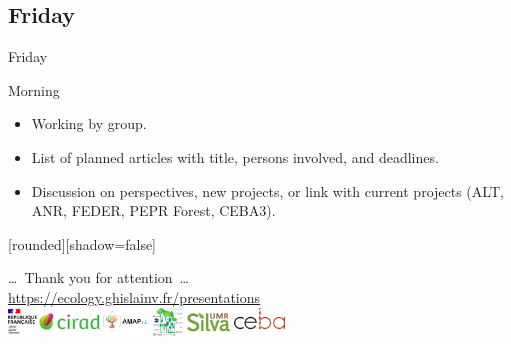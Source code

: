 \documentclass[10pt,table,dvipsnames,compress]{beamer}
\begin{document}
\subsection{Friday}
\label{sec:org99b291f}

\begin{frame}[label={sec:org8e439e6}]{Friday}
\begin{block}{Morning}
\begin{itemize}
\item Working by group.
\item List of planned articles with title, persons involved, and deadlines.
\item Discussion on perspectives, new projects, or link with current projects (ALT, ANR, FEDER, PEPR Forest, CEBA3).
\end{itemize}
\end{block}
\end{frame}


{
  [rounded][shadow=false]
  \begin{frame}[plain]
    \begin{block}{}
      \begin{center}
        \ldots~Thank you for attention~\ldots \\
        \url{https://ecology.ghislainv.fr/presentations} \\
        \includegraphics[width=0.55\textwidth]{figs/partners_logos}
      \end{center}
    \end{block}
  \end{frame}
}
\end{document}
